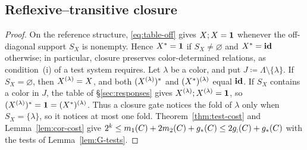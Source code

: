 \subsection{Reflexive--transitive closure}\label{sec:closure}
\closure*
\begin{proof}
On the reference structure, \eqref{eq:table-off} gives $X;X=\mathbf{1}$ whenever
the off-diagonal support $S_X$ is nonempty. Hence $X^*=\mathbf{1}$ if
$S_X\ne\varnothing$ and $X^*=\mathbf{id}$ otherwise; in particular, closure
preserves color-determined relations, as condition~(i) of a test system requires. Let
$\lambda$ be a color, and put $J\coloneqq\Lambda\setminus\{\lambda\}$. If
$S_X=\varnothing$, then $X^{(\lambda)}=X$, and both
$(X^{(\lambda)})^*$ and $(X^*)^{(\lambda)}$ equal $\mathbf{id}$. If $S_X$
contains a color in $J$, the table of \S\ref{sec:responses} gives
$X^{(\lambda)};X^{(\lambda)}=\mathbf{1}$, so
$(X^{(\lambda)})^*=\mathbf{1}=(X^*)^{(\lambda)}$. Thus a closure gate
notices the fold of $\lambda$ only when $S_X=\{\lambda\}$, so it notices
at most one fold. Theorem~\ref{thm:test-cost} and Lemma~\ref{lem:cor-cost}
give $2^k\le m_1(C)+2m_2(C)+g_*(C)\le2g_{;}(C)+g_*(C)$ with the tests of
Lemma~\ref{lem:G-tests}.
\end{proof}
